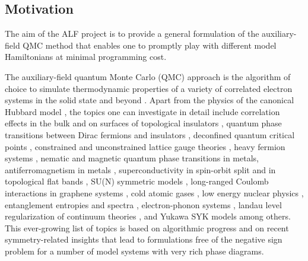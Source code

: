 



\subsection{Motivation}

The aim of the ALF project is to provide a general formulation of the auxiliary-field QMC method that enables one to promptly play with different model Hamiltonians  at  minimal programming cost.

The auxiliary-field quantum Monte Carlo (QMC) approach is the algorithm of choice to simulate  thermodynamic properties of a variety of correlated electron systems in the solid state and beyond \cite{Blankenbecler81,White89,Sugiyama86,Sorella89, Duane87, Assaad08_rev}.  
Apart from the physics of the  canonical Hubbard model 
\cite{Scalapino07,LeBlanc15},   the topics one can investigate in detail include correlation effects in the bulk and on surfaces of topological insulators \cite{Hohenadler10,Zheng11}, quantum phase transitions between  Dirac fermions  and insulators \cite{Assaad13,Toldin14,Otsuka16,Chandrasekharan13,Chandrasekharan15,Liu18,Li15a},  
deconfined quantum critical points 
\cite{Assaad16,SatoT17,Liu18},  constrained and unconstrained lattice gauge theories \cite{Assaad16,Gazit16,Gazit18,Xu18,Hohenadler18,Hohenadler19,Gazit19}, heavy fermion systems \cite{Assaad99a,Capponi00,SatoT17_1,Danu19,Danu20}, nematic \cite{Schattner15} and magnetic  \cite{Xu16c,LiuZH19} quantum phase transitions in metals, antiferromagnetism in metals \cite{Berg12},    superconductivity in spin-orbit split and in topological flat bands \cite{Tang14_1,Hofmann20, Peri20}, SU(N) symmetric models \cite{Assaad04,Lang13,Kim_F17,WangD14,Raczkowski20},  long-ranged Coulomb interactions in graphene systems \cite{Hohenadler14,Tang15,Tang17,Raczkowski17},  cold atomic gases  \cite{Rigol03},   low energy nuclear physics \cite{Lee09},  entanglement entropies and spectra \cite{Grover13,Broecker14,Assaad13a,Assaad15,Toldin18,Toldin18_1},  electron-phonon systems \cite{Chen18,Chen19,Bradley20},  landau level  regularization of continuum theories \cite{Ippoliti18,WangZ20},    and  Yukawa SYK models \cite{Pan20}   among others. 
This ever-growing list of topics is based on algorithmic progress and on recent symmetry-related insights  \cite{Wu04,Huffman14,Yao14a,Wei16} that lead to formulations free of the negative sign problem for a number of model systems with very rich phase diagrams.



